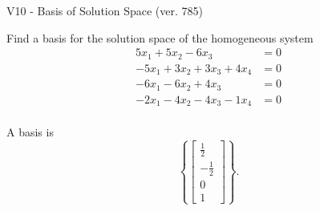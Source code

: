 \begin{exercise}
  \begin{exerciseTitle}V10 - Basis of Solution Space (ver. 785)\end{exerciseTitle}
  \begin{exerciseStatement}
    Find a basis for the solution space of the homogeneous system 
\begin{align*}
 5 x_ 1 + 5 x_ 2 -6 x_ 3 &= 0  \\ 
  -5 x_ 1 + 3 x_ 2 + 3 x_ 3 + 4 x_ 4 &= 0  \\ 
  -6 x_ 1 -6 x_ 2 + 4 x_ 3 &= 0  \\ 
  -2 x_ 1 -4 x_ 2 -4 x_ 3 -1 x_ 4 &= 0  \\ 
 \end{align*}


 
  \end{exerciseStatement}

  \begin{exerciseAnswer}
   A basis is   
\[\left\{\left[\begin{array}{c}
\frac{1}{2} \\
-\frac{1}{2} \\
0 \\
1
\end{array}\right]\right\}.\]

  


  \end{exerciseAnswer}
\end{exercise}